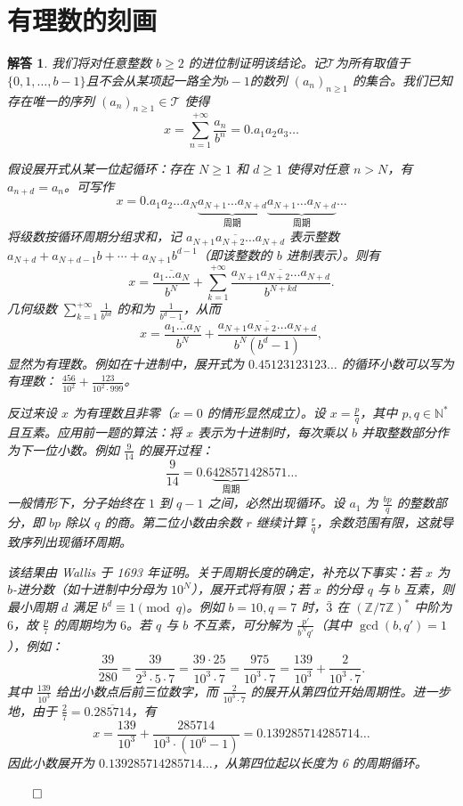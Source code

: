 \documentclass[12pt,UTF8,fontset=none]{ctexbook}
\theoremstyle{exercisestyle}
\theoremstyle{solutionstyle}
\newtheorem*{solution*}{解答}
\newenvironment{solution}
  {\begin{solution*}}
  {\hfill\ensuremath{\qed}\end{solution*}}
\begin{document}
\section{有理数的刻画}\label{caractérisation-des-rationnels}
\begin{solution}
我们将对任意整数 $b \geqslant 2$ 的进位制证明该结论。记$\mathcal T$为所有取值于$\{0,1,\ldots,b-1\}$且不会从某项起一路全为$b-1$的数列 $(a_n)_{n\geq 1}$ 的集合。我们已知存在唯一的序列 $(a_n)_{n\geq 1} \in \mathcal{T}$ 使得
$$
x = \sum_{n=1}^{+\infty} \frac{a_n}{b^n} = 0.a_1 a_2 a_3 \dots
$$

\begin{subquestions}
\item 假设展开式从某一位起循环：存在 $N \geq 1$ 和 $d \geq 1$ 使得对任意 $n > N$，有 $a_{n+d} = a_n$。可写作
$$
x = 0.a_1 a_2 \dots a_N \underbrace{a_{N+1} \dots a_{N+d}}_{\text{周期}} \underbrace{a_{N+1} \dots a_{N+d}}_{\text{周期}} \dots
$$
将级数按循环周期分组求和，记 $\overline{a_{N+1}a_{N+2}\ldots a_{N+d}}$ 表示整数 $a_{N+d} + a_{N+d-1}b + \cdots + a_{N+1}b^{d-1}$（即该整数的 $b$ 进制表示）。则有
$$
x = \frac{\overline{a_1 \dots a_N}}{b^N} + \sum_{k=1}^{+\infty} \frac{\overline{a_{N+1} a_{N+2} \dots a_{N+d}}}{b^{N+kd}}.
$$
几何级数 $\sum_{k=1}^{+\infty} \frac{1}{b^{kd}}$ 的和为 $\frac{1}{b^d-1}$，从而
$$
x = \frac{\overline{a_1 \dots a_N}}{b^N} + \frac{\overline{a_{N+1} a_{N+2} \dots a_{N+d}}}{b^N (b^d - 1)},
$$
显然为有理数。例如在十进制中，展开式为 $0.45123123123\ldots$ 的循环小数可以写为有理数： $\frac{456}{10^2} + \frac{123}{10^2 \cdot 999}$。

\item 反过来设 $x$ 为有理数且非零（$x=0$ 的情形显然成立）。设 $x = \frac{p}{q}$，其中 $p,q \in \mathbb{N}^*$ 且互素。应用前一题的算法：将 $x$ 表示为十进制时，每次乘以 $b$ 并取整数部分作为下一位小数。例如 $\frac{9}{14}$ 的展开过程：
$$
\frac{9}{14} = 0.6\underbrace{428571}_{\text{周期}}428571\dots
$$
一般情形下，分子始终在 $1$ 到 $q-1$ 之间，必然出现循环。设 $a_1$ 为 $\frac{bp}{q}$ 的整数部分，即 $bp$ 除以 $q$ 的商。第二位小数由余数 $r$ 继续计算 $\frac{r}{q}$，余数范围有限，这就导致序列出现循环周期。
\end{subquestions}

该结果由 Wallis 于 1693 年证明。关于周期长度的确定，补充以下事实：若 $x$ 为 $b$-进分数（如十进制中分母为 $10^N$），展开式将有限；若 $x$ 的分母 $q$ 与 $b$ 互素，则最小周期 $d$ 满足 $b^d \equiv 1 \pmod{q}$。例如 $b=10,q=7$ 时，$\bar{3}$ 在 $(\mathbb{Z}/7\mathbb{Z})^*$ 中阶为 $6$，故 $\frac{p}{7}$ 的周期均为 $6$。若 $q$ 与 $b$ 不互素，可分解为 $\frac{p'}{b^Nq'}$（其中 $\gcd(b,q')=1$），例如：
$$
\frac{39}{280} = \frac{39}{2^3 \cdot 5 \cdot 7} = \frac{39 \cdot 25}{10^3 \cdot 7} = \frac{975}{10^3 \cdot 7} = \frac{139}{10^3} + \frac{2}{10^3 \cdot 7}.
$$
其中 $\frac{139}{10^3}$ 给出小数点后前三位数字，而 $\frac{2}{10^3 \cdot 7}$ 的展开从第四位开始周期性。进一步地，由于 $\frac{2}{7} = 0.\overline{285714}$，有
$$
x = \frac{139}{10^3} + \frac{285714}{10^3 \cdot (10^6 - 1)} = 0.139285714285714\ldots
$$
因此小数展开为 $0.139285714285714\ldots$，从第四位起以长度为 6 的周期循环。


\end{solution}
\end{document}
